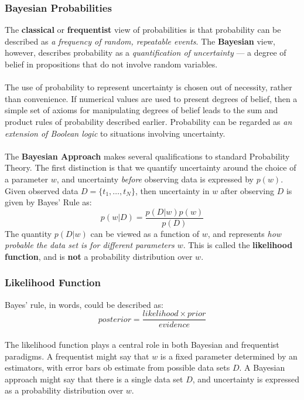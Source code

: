 \documentclass[11pt]{article} %
\begin{document}
\subsubsection{Bayesian Probabilities}

The {\bf classical} or {\bf frequentist} view of probabilities is that probability can be described as {\em a frequency of random, repeatable events}. The {\bf Bayesian} view, however, describes probability as a {\em quantification of uncertainty} --- a degree of belief in propositions that do not involve random variables. \\
~\\
The use of probability to represent uncertainty is chosen out of necessity, rather than convenience. If numerical values are used to present degrees of belief, then a simple set of axioms for manipulating degrees of belief leads to the sum and product rules of probability described earlier. Probability can be regarded as {\em an extension of Boolean logic} to situations involving uncertainty. \\
~\\
The {\bf Bayesian Approach} makes several qualifications to standard Probability Theory. The first distinction is that we quantify uncertainty around the choice of a parameter $w$, and uncertainty {\em before} observing data is expressed by $p(w)$. Given observed data $D = \{t_1,\ldots,t_N\}$, then uncertainty in $w$ after observing $D$ is given by Bayes' Rule as: 
$$
p(w|D) = \frac{p(D|w)p(w)}{p(D)}
$$
The quantity $p(D|w)$ can be viewed as a function of $w$, and represents {\em how probable the data set is for different parameters $w$}. This is called the {\bf likelihood function}, and is {\bf not} a probability distribution over $w$.

\subsubsection{Likelihood Function}

Bayes' rule, in words, could be described as:
\begin{equation}
posterior = \frac{likelihood \times prior}{evidence}
\end{equation}
~\\
The likelihood function plays a central role in both Bayesian and frequentist paradigms. A frequentist might say that $w$ is a fixed parameter determined by an estimators, with error bars ob estimate from possible data sets $D$. A Bayesian approach might say that there is a single data set $D$, and uncertainty is expressed as a probability distribution over $w$.
\end{document}
